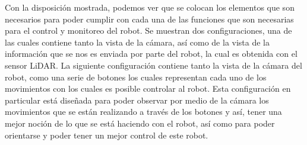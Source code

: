     \vskip 0.5cm
    Con la disposici\'on mostrada, podemos ver que se colocan
        los elementos que son necesarios para poder cumplir con
        cada una de las funciones que son necesarias para el control
        y monitoreo del robot. Se muestran dos configuraciones, una
        de las cuales contiene tanto la vista de la c\'amara, as\'i como
        de la vista de la informaci\'on que se nos es enviada por parte
        del robot, la cual es obtenida con el sensor LiDAR. La
        siguiente configuraci\'on contiene tanto la vista de la c\'amara
        del robot, como una serie de botones los cuales representan
        cada uno de los movimientos con los cuales es posible
        controlar al robot. Esta configuraci\'on en particular est\'a
        dise\~nada para poder observar por medio de la c\'amara los
        movimientos que se est\'an realizando a trav\'es de los botones
        y as\'i, tener una mejor noci\'on de lo que se est\'a haciendo con
        el robot, as\'i como para poder orientarse y poder tener un
        mejor control de este robot.